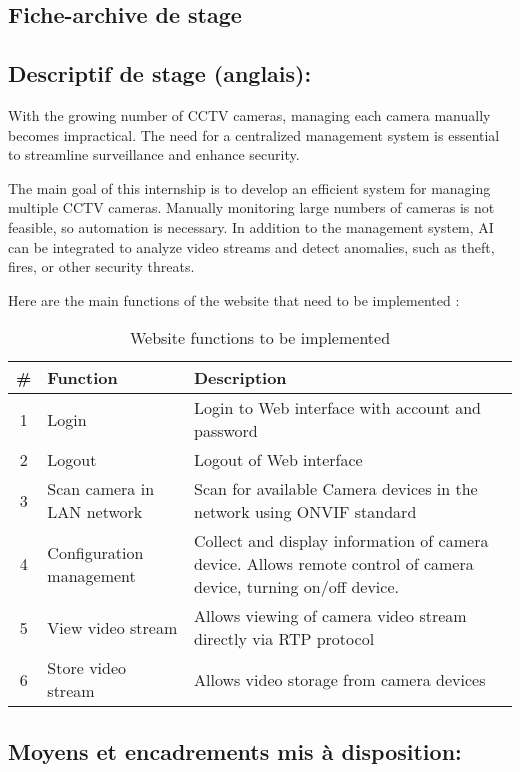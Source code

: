 \begin{appendices}
\chapter{Fiche-archive de stage}



\section{Descriptif de stage (anglais):}

With the growing number of CCTV cameras, managing each camera manually becomes impractical. The need for a centralized management system is essential to streamline surveillance and enhance security. 

The main goal of this internship is to develop an efficient system for managing multiple CCTV cameras. Manually monitoring large numbers of cameras is not feasible, so automation is necessary. In addition to the management system, AI can be integrated to analyze video streams and detect anomalies, such as theft, fires, or other security threats. 

Here are the main functions of the website that need to be implemented :

\begin{table}[H]
\centering
\begin{tabular}{|c|l|p{8cm}|}
\hline
\# & Function & Description \\ \hline
1 & Login & Login to Web interface with account and password \\ \hline
2 & Logout & Logout of Web interface \\ \hline
3 & Scan camera in LAN network & Scan for available Camera devices in the network using ONVIF standard \\ \hline
4 & Configuration management & Collect and display information of camera device. Allows remote control of camera device, turning on/off device. \\ \hline
5 & View video stream & Allows viewing of camera video stream directly via RTP protocol \\ \hline
6 & Store video stream & Allows video storage from camera devices \\ \hline
\end{tabular}
\caption{Website functions to be implemented}
\label{tab:websitefunct}
\end{table}

\section{Moyens et encadrements mis à disposition:}


\end{appendices}
